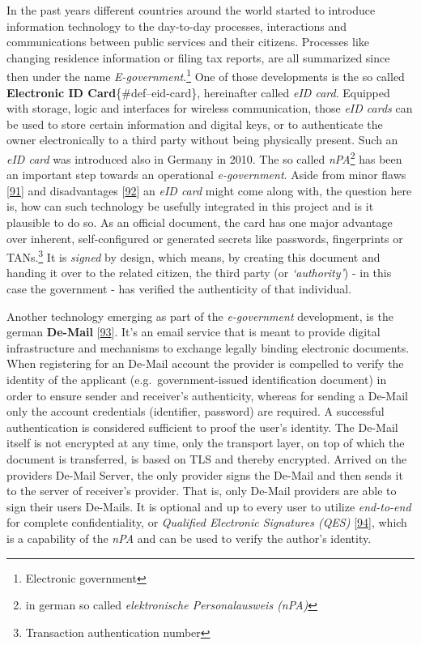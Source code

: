 \documentclass[12pt,english,a4paper,titlepage,cleardoublepage=empty,dottedtoc]{report}
\begin{document}
In the past years different countries around the world started to
introduce information technology to the day-to-day processes,
interactions and communications between public services and their
citizens. Processes like changing residence information or filing tax
reports, are all summarized since then under the name
\emph{E-government}.\footnote{Electronic government} One of those
developments is the so called \textbf{Electronic ID
Card}\{\#def--eid-card\}, hereinafter called \emph{eID card}. Equipped
with storage, logic and interfaces for wireless communication, those
\emph{eID cards} can be used to store certain information and digital
keys, or to authenticate the owner electronically to a third party
without being physically present. Such an \emph{eID card} was introduced
also in Germany in 2010. The so called \emph{nPA}\footnote{in german so
  called \emph{elektronische Personalausweis (nPA)}} has been an
important step towards an operational \emph{e-government}. Aside from
minor flaws
{[}\protect\hyperlink{ref-web_2013_npa-sicherheitsdefizit}{91}{]} and
disadvantages
{[}\protect\hyperlink{ref-web_2014_test-qes-support-in-npa}{92}{]} an
\emph{eID card} might come along with, the question here is, how can
such technology be usefully integrated in this project and is it
plausible to do so. As an official document, the card has one major
advantage over inherent, self-configured or generated secrets like
passwords, fingerprints or TANs.\footnote{Transaction authentication
  number} It is \emph{signed} by design, which means, by creating this
document and handing it over to the related citizen, the third party (or
\emph{`authority'}) - in this case the government - has verified the
authenticity of that individual.

Another technology emerging as part of the \emph{e-government}
development, is the german
\textbf{\protect\hypertarget{def--de-mail}{}{De-Mail}}
{[}\protect\hyperlink{ref-web_2017_about-de-mail}{93}{]}. It's an email
service that is meant to provide digital infrastructure and mechanisms
to exchange legally binding electronic documents. When registering for
an De-Mail account the provider is compelled to verify the identity of
the applicant (e.g.~government-issued identification document) in order
to ensure sender and receiver's authenticity, whereas for sending a
De-Mail only the account credentials (identifier, password) are
required. A successful authentication is considered sufficient to proof
the user's identity. The De-Mail itself is not encrypted at any time,
only the transport layer, on top of which the document is transferred,
is based on TLS and thereby encrypted. Arrived on the providers De-Mail
Server, the only provider signs the De-Mail and then sends it to the
server of receiver's provider. That is, only De-Mail providers are able
to sign their users De-Mails. It is optional and up to every user to
utilize \emph{end-to-end} for complete confidentiality, or
\emph{Qualified Electronic Signatures (QES)}
{[}\protect\hyperlink{ref-web_2017_wikipedia_qes}{94}{]}, which is a
capability of the \emph{nPA} and can be used to verify the author's
identity.
\end{document}
